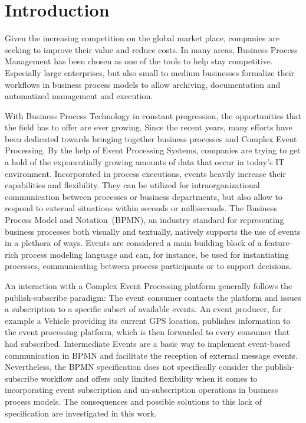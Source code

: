 \chapter{Introduction}

Given the increasing competition on the global market place, companies are seeking to improve their value and reduce costs.
In many areas, Business Process Management has been chosen as one of the tools to help stay competitive.
Especially large enterprises, but also small to medium businesses formalize their workflows in business process models to allow archiving, documentation and automatized management and execution.

With Business Process Technology in constant progression, the opportunities that the field has to offer are ever growing.
Since the recent years, many efforts have been dedicated towards bringing together business processes and Complex Event Processing.
By the help of Event Processing Systems, companies are trying to get a hold of the exponentially growing amounts of data that occur in today's IT environment.
Incorporated in process executions, events heavily increase their capabilities and flexibility. They can be utilized for intraorganizational communication between processes or business departments, but also allow to respond to external situations within seconds or milliseconds.
The Business Process Model and Notation~(BPMN), an industry standard for representing business processes both visually and textually, natively supports the use of events in a plethora of ways. Events are considered a main building block of a feature-rich process modeling language and can, for instance, be used for instantiating processes, communicating between process participants or to support decisions.

An interaction with a Complex Event Processing platform generally follows the publish-subscribe paradigm: The event consumer contacts the platform and issues a subscription to a specific subset of available events.
An event producer, for example a Vehicle providing its current GPS location, publishes information to the event processing platform, which is then forwarded to every consumer that had subscribed.
Intermediate Events are a basic way to implement event-based communication in BPMN and facilitate the reception of external message events.
Nevertheless, the BPMN specification does not specifically consider the publish-subscribe workflow and offers only limited flexibility when it comes to incorporating event subscription and un-subscription operations in business process models.
The consequences and possible solutions to this lack of specification are investigated in this work.


